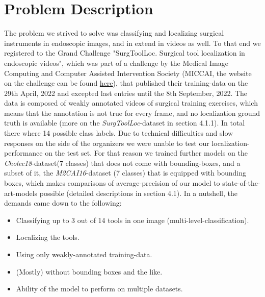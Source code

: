 \section{Problem Description}
The problem we strived to solve was classifying and localizing surgical instruments in endoscopic images, and in extend in videos as well. 
To that end we registered to the Grand Challenge "SurgToolLoc. Surgical tool localization in endoscopic videos", which was part of a challenge by the Medical Image Computing and Computer Assisted Intervention Society (MICCAI, the website on the challenge can be found \href{https://surgtoolloc.grand-challenge.org}{here}), that published their training-data on the 29th April, 2022 and excepted last entries until the 8th September, 2022. The data is composed of weakly annotated videos of surgical training exercises, which means that the annotation is not true for every frame, and no localization ground truth is available (more on the \textit{SurgToolLoc}-dataset in section 4.1.1). In total there where 14 possible class labels. Due to technical difficulties and slow responses on the side of the organizers we were unable to test our localization-performance on the test set. For that reason we trained further models on the \textit{Cholec18}-dataset(7 classes) that does not come with bounding-boxes, and a subset of it, the \textit{M2CAI16}-dataset (7 classes) that is equipped with bounding boxes, which makes comparisons of average-precision of our model to state-of-the-art-models possible (detailed descriptions in section 4.1).
In a nutshell, the demands came down to the following:
\begin{itemize}
	\item Classifying up to 3 out of 14 tools in one image (multi-level-classification).
	\item Localizing the tools.
	\item Using only weakly-annotated training-data.
	\item (Mostly) without bounding boxes and the like.
	\item Ability of the model to perform on multiple datasets.
\end{itemize}

